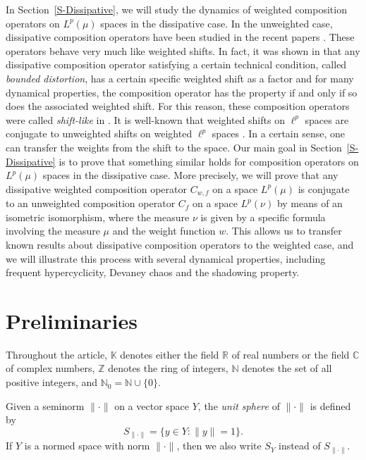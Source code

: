 \documentclass[12pt]{article}
\theoremstyle{plain}
\theoremstyle{definition}
\newcommand{\N}{\mathbb{N}} %
\newcommand{\Z}{\mathbb{Z}} %
\newcommand{\R}{\mathbb{R}} %
\newcommand{\C}{\mathbb{C}} %
\newcommand{\K}{\mathbb{K}} %
\begin{document}
In Section~\ref{S-Dissipative}, we will study the dynamics of weighted composition operators on $L^p(\mu)$ spaces in the dissipative case.
In the unweighted case, dissipative composition operators have been studied in the recent papers
\cite{BerBonPin26, AniDarMai21, AniDarMai22, EAniMMai23, AniMaiSeo24, UDarBPir21, DGomKGro25, MMai22, MMai23}.
These operators behave very much like weighted shifts. 
In fact, it was shown in \cite{AniDarMai22} that any dissipative composition operator 
satisfying a certain technical condition, called {\em bounded distortion}, has a certain specific weighted shift as a factor
and for many dynamical properties, the composition operator has the property if and only if so does the associated weighted shift.
For this reason, these composition operators were called {\em shift-like} in \cite{AniDarMai22}.
It is well-known that weighted shifts on $\ell^p$ spaces are conjugate 
to unweighted shifts on weighted $\ell^p$ spaces \cite[Section~4.1]{KGroAPer11}. 
In a certain sense, one can transfer the weights from the shift to the space.
Our main goal in Section~\ref{S-Dissipative} is to prove that something similar holds for composition operators 
on $L^p(\mu)$ spaces in the dissipative case.
More precisely, we will prove that any dissipative weighted composition operator $C_{w,f}$ on a space $L^p(\mu)$ 
is conjugate to an unweighted composition operator $C_f$ on a space $L^p(\nu)$ by means of an isometric isomorphism,
where the measure $\nu$ is given by a specific formula involving the measure $\mu$ and the weight function $w$.
This allows us to transfer known results about dissipative composition operators to the weighted case, and we will illustrate 
this process with several dynamical properties, including frequent hypercyclicity, Devaney chaos and the shadowing property.


\section{Preliminaries}\label{S-Preliminaries}

Throughout the article, $\K$ denotes either the field $\R$ of real numbers or the field $\C$ of complex numbers,
$\Z$ denotes the ring of integers, $\N$ denotes the set of all positive integers, and $\N_0 = \N \cup \{0\}$.

Given a seminorm $\|\cdot\|$ on a vector space $Y$, the {\em unit sphere} of $\|\cdot\|$ is defined by
\[
S_{\|\cdot\|} = \{y \in Y : \|y\| = 1\}.
\]
If $Y$ is a normed space with norm $\|\cdot\|$, then we also write $S_Y$ instead of $S_{\|\cdot\|}$.
\end{document}
